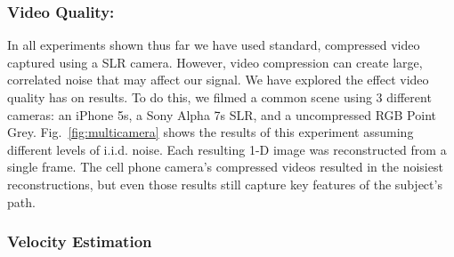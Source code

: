 



\vspace{-.1in}
\subsubsection{Video Quality: } In all experiments shown thus far we have used standard, compressed video captured using a SLR camera.
However, 
video compression can create large, correlated noise that may affect our signal. 
We have explored the effect video quality has on results. To do this, we filmed a common scene using 3 different cameras: an iPhone 5s, a Sony Alpha 7s SLR, and a uncompressed RGB Point Grey. Fig.~\ref{fig:multicamera} shows the results of this experiment assuming different levels of i.i.d. noise. Each resulting 1-D image was reconstructed from a single frame. 
The cell phone camera's compressed videos resulted in the noisiest reconstructions, but even those results still capture key features of the subject's path.





\vspace{-.1in}
\subsubsection{Velocity Estimation} 

